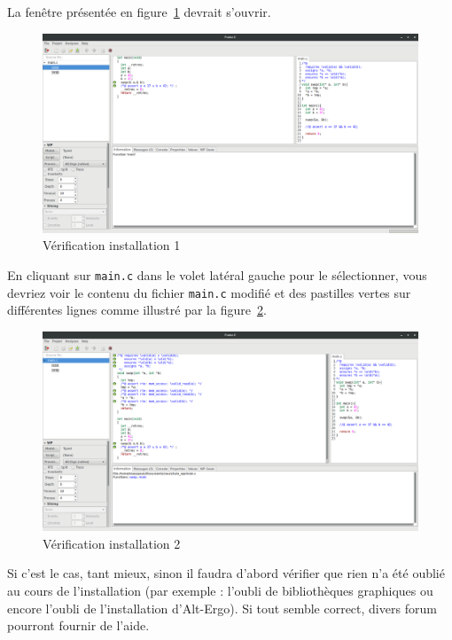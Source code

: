 \documentclass[12pt,francais,]{scrbook}
\begin{document}
La fenêtre présentée en figure~\ref{fig:install-1} devrait s'ouvrir.

\begin{figure}[htbp]
\centering
\includegraphics[scale=0.5]{1-2-verif_install-1.png}
\caption{Vérification installation 1}
\label{fig:install-1}
\end{figure}

En cliquant sur \texttt{main.c} dans le volet latéral gauche pour le
sélectionner, vous devriez voir le contenu du fichier \texttt{main.c}
modifié et des pastilles vertes sur différentes lignes comme
illustré par la figure~\ref{fig:install-2}.

\begin{figure}[htbp]
\centering
\includegraphics[scale=0.5]{1-2-verif_install-2.png}
\caption{Vérification installation 2}
\label{fig:install-2}
\end{figure}

Si c'est le cas, tant mieux, sinon il faudra d'abord vérifier que rien
n'a été oublié au cours de l'installation (par exemple : l'oubli de
bibliothèques graphiques ou encore l'oubli de l'installation
d'Alt-Ergo). Si tout semble correct, divers forum pourront fournir de
l'aide.
\end{document}
